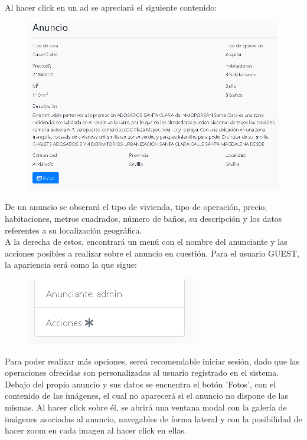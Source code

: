 Al hacer click en un ad se apreciar\'{a} el siguiente contenido:

\begin{figure}[h!]
\centering
\includegraphics[width=.7\textwidth]{Img/ManualUsuario/ANUNCIO_GUEST.png}
\end{figure}

De un anuncio se obserar\'{a} el tipo de vivienda, tipo de operaci\'{o}n, precio, habitaciones, metros cuadrados, n\'{u}mero de ba\~{n}os, su descripci\'{o}n y los datos referentes a su localizaci\'{o}n geogr\'{a}fica.\\

A la derecha de estos, encontrar\'{a} un men\'{u} con el nombre del anunciante y las acciones posibles a realizar sobre el anuncio en cuesti\'{o}n. Para el usuario GUEST, la apariencia ser\'{a} como la que sigue:

\begin{figure}[h!]
\centering
\includegraphics[width=.3\textwidth]{Img/ManualUsuario/LAGERAL_AD_GUEST.png}
\end{figure}

Para poder realizar m\'{a}s opciones, sere\'{a} recomendable iniciar sesi\'{o}n, dado que las operaciones ofrecidas son personalizadas al usuario registrado en el sistema.\\

Debajo del propio anuncio y sus datos se encuentra el bot\'{o}n 'Fotos', con el contenido de las im\'{a}genes, el cual no aparecer\'{a} si el anuncio no dispone de las mismas. Al hacer click sobre \'{e}l, se abrir\'{a} una ventana modal con la galer\'{i}a de im\'{a}genes asociadas al anuncio, navegables de forma lateral y con la posibilidad de hacer zoom en cada imagen al hacer click en ellas.

